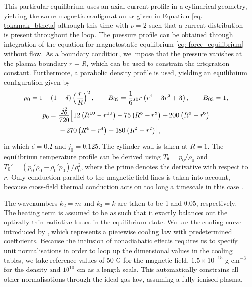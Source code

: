 This particular equilibrium uses an axial current profile in a cylindrical geometry, yielding the same magnetic configuration as given in Equation \eqref{eq: tokamak_btheta} although this time with $\nu = 2$ such that a current distribution is present throughout the loop. The pressure profile can be obtained through integration of the equation for magnetostatic equilibrium \eqref{eq: force_equilibrium} without flow. As a boundary condition, we impose that the pressure vanishes at the plasma boundary $r = R$, which can be used to constrain the integration constant. Furthermore, a parabolic density profile is used, yielding an equilibrium configuration given by
\begin{equation} \label{eq: discrete_alfven_equilibrium}
  \begin{gathered}
    \rho_0 = 1 - \left(1 - d\right)\left(\frac{r}{R}\right)^2,
    \qquad
    B_{02} = \frac{1}{6}j_0 r\left(r^4 - 3r^2 + 3\right),
    \qquad
    B_{03} = 1, \\
    \begin{aligned}
      p_0 = ~&\frac{j_0^2}{720}\Bigl[
        12\left(R^{10} - r^{10}\right)
        - 75\left(R^8 - r^8\right)
        + 200\left(R^6 - r^6\right) \\ \Bigl.
        &- 270\left(R^4 - r^4\right)
        + 180\left(R^2 - r^2\right)
      \Bigr],
    \end{aligned}
  \end{gathered}
\end{equation}
in which $d = 0.2$ and $j_0 = 0.125$. The cylinder wall is taken at $R = 1$. The equilibrium temperature profile can be derived using $T_0 = p_0 / \rho_0$ and $T_0' = \left(p_0'\rho_0 - \rho_0'p_0\right)/\rho_0^2$, where the prime denotes the derivative with respect to $r$. Only conduction parallel to the magnetic field lines is taken into account,
because cross-field thermal conduction acts on too long a timescale in this case \citep{keppens1993}.

The wavenumbers $k_2 = m$ and $k_3 = k$ are taken to be 1 and 0.05, respectively. The heating term is assumed to be as such that it exactly balances out the optically thin radiative losses in the equilibrium state. We use the cooling curve introduced by \citet{rosner1978}, which represents a piecewise cooling law with predetermined coefficients. Because the inclusion of nonadiabatic effects requires us to specify unit normalisations in order to loop up the dimensional values in the cooling tables, we take reference values of 50 G for the magnetic field, $1.5 \times 10^{-15}$ g cm$^{-3}$ for the density and $10^{10}$ cm as a length scale. This automatically constrains all other normalisations through the ideal gas law, assuming a fully ionised plasma.

